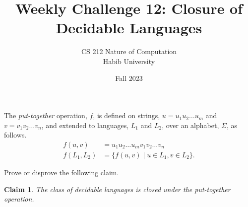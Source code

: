 \documentclass[a4paper]{exam}
\title{Weekly Challenge 12: Closure of Decidable Languages}
\author{CS 212 Nature of Computation\\Habib University}
\date{Fall 2023}
\theoremstyle{theorem}
\theoremstyle{claim}
\newtheorem{claim}{Claim}
\begin{document}
\maketitle

\begin{questions}


  The \textit{put-together} operation, $f$, is defined on strings, $u=u_1u_2\ldots u_m$ and $v=v_1v_2\ldots v_n$, and extended to languages, $L_1$ and $L_2$, over an alphabet, $\Sigma$, as follows.
  \begin{align*}
    f(u,v) & = u_1u_2\ldots u_mv_1v_2\ldots v_n\\
    f(L_1, L_2) & = \{ f(u,v) \mid u\in L_1, v\in L_2 \}.
  \end{align*}
  
  Prove or disprove the following claim.
   \begin{claim}
     The class of decidable languages is closed under the put-together operation.
   \end{claim}
   
  
\end{questions}
\end{document}
